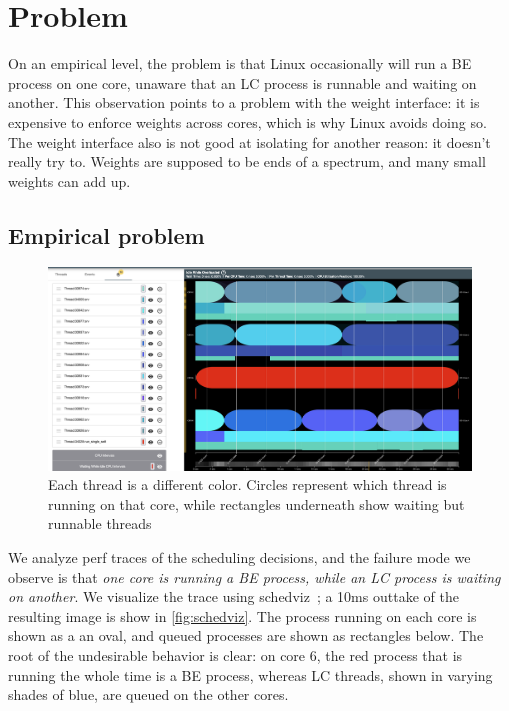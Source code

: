 \section{Problem}\label{s:problem}

On an empirical level, the problem is that Linux occasionally will run a BE
process on one core, unaware that an LC process is runnable and waiting on
another. This observation points to a problem with the \cgroups{} weight
interface: it is expensive to enforce weights across cores, which is why Linux
avoids doing so. The \cgroups{} weight interface also is not good at isolating
for another reason: it doesn't really try to. Weights are supposed to be ends of
a spectrum, and many small weights can add up.

\subsection{Empirical problem}

\begin{figure}[t]
    \centering
    \includegraphics[width=\columnwidth]{graphs/schedviz.png}
    \caption{Each thread is a different color. Circles represent which
    thread is running on that core, while rectangles underneath show waiting but
    runnable threads
    }\label{fig:schedviz}
\end{figure}

We analyze perf traces of the scheduling decisions, and the failure mode we
observe is that \textit{one core is running a BE process, while an LC process is
waiting on another}. We visualize the trace using schedviz~\cite{TODO}; a 10ms
outtake of the resulting image is show in \autoref{fig:schedviz}. The process
running on each core is shown as a an oval, and queued processes are shown as
rectangles below. The root of the undesirable behavior is clear: on core 6, the
red process that is running the whole time is a BE process, whereas LC threads,
shown in varying shades of blue, are queued on the other cores.

